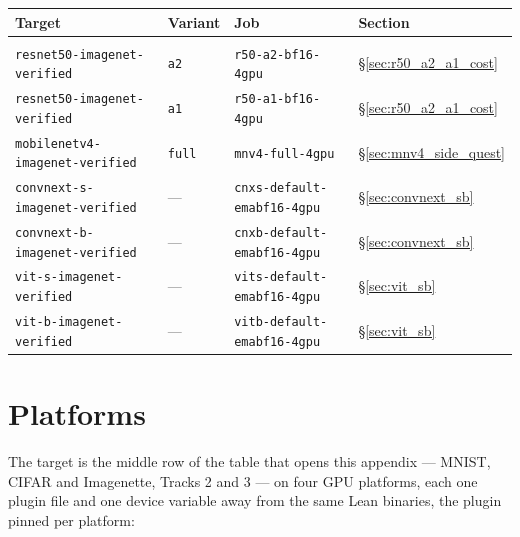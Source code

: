 \begin{center}
\small
\begin{tabular}{@{}llll@{}}
\textbf{Target} & \textbf{Variant} & \textbf{Job} & \textbf{Section} \\[2pt]
\hline \\[-6pt]
\texttt{resnet50-imagenet-verified}    & \texttt{a2} & \texttt{r50-a2-bf16-4gpu} & \S\ref{sec:r50_a2_a1_cost} \\
\texttt{resnet50-imagenet-verified}    & \texttt{a1} & \texttt{r50-a1-bf16-4gpu} & \S\ref{sec:r50_a2_a1_cost} \\
\texttt{mobilenetv4-imagenet-verified} & \texttt{full} & \texttt{mnv4-full-4gpu} & \S\ref{sec:mnv4_side_quest} \\
\texttt{convnext-s-imagenet-verified}  & --- & \texttt{cnxs-default-emabf16-4gpu} & \S\ref{sec:convnext_sb} \\
\texttt{convnext-b-imagenet-verified}  & --- & \texttt{cnxb-default-emabf16-4gpu} & \S\ref{sec:convnext_sb} \\
\texttt{vit-s-imagenet-verified}       & --- & \texttt{vits-default-emabf16-4gpu} & \S\ref{sec:vit_sb} \\
\texttt{vit-b-imagenet-verified}       & --- & \texttt{vitb-default-emabf16-4gpu} & \S\ref{sec:vit_sb} \\
\end{tabular}
\end{center}

\section*{Platforms}
\label{sec:getting_started_platforms}

The target is the middle row of the table that opens this appendix --- MNIST,
CIFAR and Imagenette, Tracks 2 and 3 --- on four GPU platforms, each one
plugin file and one device variable away from the same Lean binaries, the
plugin pinned per platform:

